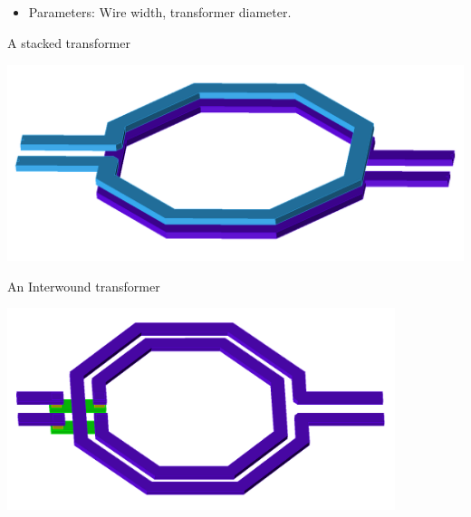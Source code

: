\documentclass{sdkslides}
\begin{document}
\subsection*{\sectionname}
\begin{frame}[c]
    \frametitle{\sectionname}
    \begin{itemize}
        \item Parameters: Wire width, transformer diameter.
    \end{itemize}
    \begin{minipage}[t]{0.48\textwidth}
        \vskip 0pt
        \begin{block}{A stacked transformer}
            \begin{center}
                \includegraphics[width=\textwidth]{./Pics/stacked_TF_3D_view_white_background.png}
            \end{center}
        \end{block}
    \end{minipage}\hfill
    \begin{minipage}[t]{0.48\textwidth}
        \vskip 0pt
        \begin{block}{An Interwound transformer}
            \begin{center}
                \includegraphics[width=0.85\textwidth]{./Pics/int_TF_3D_white_background_2.png}
            \end{center}
        \end{block}
    \end{minipage}
\end{frame}
\end{document}

